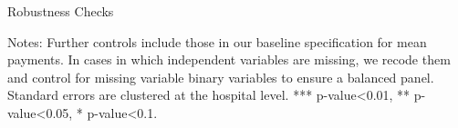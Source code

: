 \documentclass[12pt]{article}
\begin{document}
\setlength{\captionmargin}{.5 \textwidth} \addtolength{\captionmargin}{-.5\wd\gfxbox}
\begin{table}[!h]
\centering
\caption{Robustness Checks}
\label{tab:bymktshare}
\usebox{\gfxbox}
\par
\begin{minipage}{\wd\gfxbox}
\footnotesize
Notes: Further controls include those in our baseline specification for mean payments.  In cases in which independent variables are missing, we recode them and control for missing variable binary variables to ensure a balanced panel.  Standard errors are clustered at the hospital level.  *** p-value<0.01, ** p-value<0.05, * p-value<0.1.
\end{minipage}
\end{table}
\end{document}
